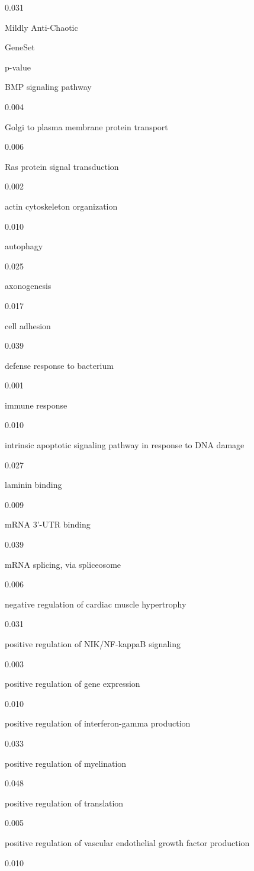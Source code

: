 \documentclass[
  letterpaper,
  DIV=11,
  numbers=noendperiod,
  openany,
  oneside]{scrreprt}
\begin{document}
0.031

Mildly Anti-Chaotic

GeneSet

p-value

BMP signaling pathway

0.004

Golgi to plasma membrane protein transport

0.006

Ras protein signal transduction

0.002

actin cytoskeleton organization

0.010

autophagy

0.025

axonogenesis

0.017

cell adhesion

0.039

defense response to bacterium

0.001

immune response

0.010

intrinsic apoptotic signaling pathway in response to DNA damage

0.027

laminin binding

0.009

mRNA 3'-UTR binding

0.039

mRNA splicing, via spliceosome

0.006

negative regulation of cardiac muscle hypertrophy

0.031

positive regulation of NIK/NF-kappaB signaling

0.003

positive regulation of gene expression

0.010

positive regulation of interferon-gamma production

0.033

positive regulation of myelination

0.048

positive regulation of translation

0.005

positive regulation of vascular endothelial growth factor production

0.010
\end{document}
